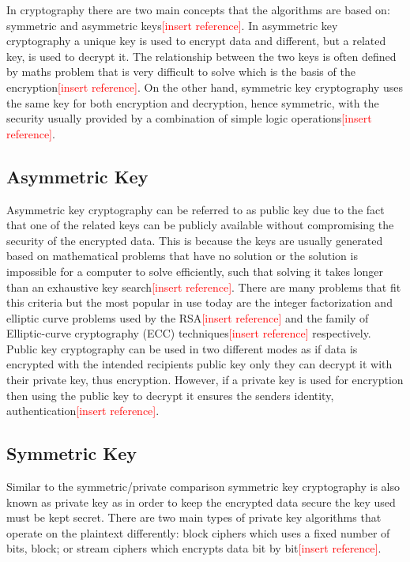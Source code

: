 \documentclass[12pt,twoside,a4paper]{report}
\begin{document}
    In cryptography there are two main concepts that the algorithms are based on: symmetric and asymmetric keys\textcolor{red}{[insert reference]}. In asymmetric key cryptography a unique key is used to encrypt data and different, but a related key, is used to decrypt it. The relationship between the two keys is often defined by maths problem that is very difficult to solve which is the basis of the encryption\textcolor{red}{[insert reference]}. On the other hand, symmetric key cryptography uses the same key for both encryption and decryption, hence symmetric, with the security usually provided by a combination of simple logic operations\textcolor{red}{[insert reference]}.
    
    \subsection{Asymmetric Key}
    Asymmetric key cryptography can be referred to as public key due to the fact that one of the related keys can be publicly available without compromising the security of the encrypted data. This is because the keys are usually generated based on mathematical problems that have no solution or the solution is impossible for a computer to solve efficiently, such that solving it takes longer than an exhaustive key search\textcolor{red}{[insert reference]}. There are many problems that fit this criteria but the most popular in use today are the integer factorization and elliptic curve problems used by the RSA\textcolor{red}{[insert reference]} and the family of Elliptic-curve cryptography (ECC) techniques\textcolor{red}{[insert reference]} respectively. Public key cryptography can be used in two different modes as if data is encrypted with the intended recipients public key only they can decrypt it with their private key, thus encryption. However, if a private key is used for encryption then using the public key to decrypt it ensures the senders identity, authentication\textcolor{red}{[insert reference]}.
    
    \subsection{Symmetric Key}
    Similar to the symmetric/private comparison symmetric key cryptography is also known as private key as in order to keep the encrypted data secure the key used must be kept secret. There are two main types of private key algorithms that operate on the plaintext differently: block ciphers which uses a fixed number of bits, block; or stream ciphers which encrypts data bit by bit\textcolor{red}{[insert reference]}.
    
\end{document}
